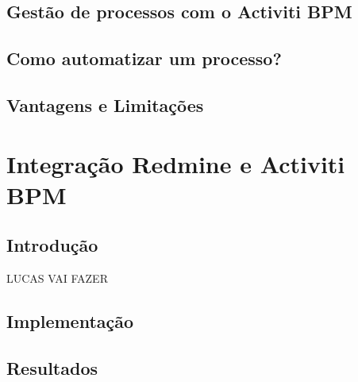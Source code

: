 \section{Gestão de processos com o Activiti BPM}\label{sec:LABEL_CHP_4_SEC_C}

\section{Como automatizar um processo?}\label{sec:LABEL_CHP_4_SEC_D}

\section{Vantagens e Limitações}\label{sec:LABEL_CHP_4_SEC_E}


\chapter{Integração Redmine e Activiti BPM}\label{chp:LABEL_CHP_5}

\section{Introdução}\label{sec:LABEL_CHP_5_SEC_A}
LUCAS VAI FAZER

\section{Implementação}\label{sec:LABEL_CHP_5_SEC_A}

\section{Resultados}\label{sec:LABEL_CHP_5_SEC_A}